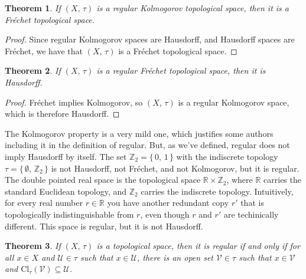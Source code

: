 \documentclass{article}
\theoremstyle{plain}
\newtheorem{theorem}{Theorem}[section]
\theoremstyle{normal}
\newenvironment{example}{%
    \pushQED{\qed}\renewcommand{\qedsymbol}{$\blacksquare$}\examplex%
}{%
    \popQED\endexamplex%
}
\begin{document}
        \begin{theorem}
            If $(X,\,\tau)$ is a regular Kolmogorov topological space, then
            it is a Fr\'{e}chet topological space.
        \end{theorem}
        \begin{proof}
            Since regular Kolmogorov spaces are Hausdorff, and Hausdorff spaces
            are Fr\'{e}chet, we have that $(X,\,\tau)$ is a Fr\'{e}chet
            topological space.
        \end{proof}
        \begin{theorem}
            If $(X,\,\tau)$ is a regular Fr\'{e}chet topological space, then
            it is Hausdorff.
        \end{theorem}
        \begin{proof}
            Fr\'{e}chet implies Kolmogorov, so $(X,\,\tau)$ is a regular
            Kolmogorov space, which is therefore Hausdorff.
        \end{proof}
        \begin{example}
            The Kolmogorov property is a very mild one, which justifies
            some authors including it in the definition of regular. But, as
            we've defined, regular does not imply Hausdorff by itself.
            The set $\mathbb{Z}_{2}=\{\,0,\,1\,\}$ with the indiscrete
            topology $\tau=\{\,\emptyset,\,\mathbb{Z}_{2}\,\}$ is not Hausdorff,
            not Fr\'{e}chet, and not Kolmogorov, but it is regular.
        \end{example}
        \begin{example}[\textbf{The Double Pointed Reals}]
            The double pointed real space is the topological space
            $\mathbb{R}\times\mathbb{Z}_{2}$, where $\mathbb{R}$ carries the
            standard Euclidean topology, and $\mathbb{Z}_{2}$ carries the
            indiscrete topology. Intuitively, for every real number
            $r\in\mathbb{R}$ you have another redundant copy $r'$ that is
            topologically indistinguishable from $r$, even though $r$ and $r'$
            are techinically different. This space is regular, but it is
            not Hausdorff.
        \end{example}
        \begin{theorem}
            If $(X,\,\tau)$ is a topological space, then it is regular if and
            only if for all $x\in{X}$ and $\mathcal{U}\in\tau$ such that
            $x\in\mathcal{U}$, there is an open set $\mathcal{V}\in\tau$
            such that $x\in\mathcal{V}$ and
            $\textrm{Cl}_{\tau}(\mathcal{V})\subseteq\mathcal{U}$.
        \end{theorem}
\end{document}
